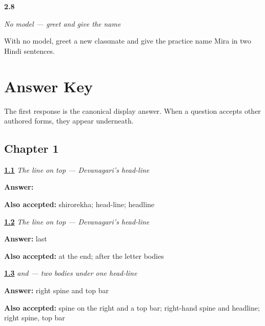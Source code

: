 \noindent\begin{minipage}[t]{\linewidth}
\raggedright
\hypertarget{review-HI-W06-two-sentence-no-model-check}{\textbf{2.8}} \emph{No model — greet and give the name}\par
\small With no model, greet a new classmate and give the practice name Mira in two Hindi sentences.
\end{minipage}\par\medskip

\chapter*{Answer Key}

The first response is the canonical display answer. When a question accepts other authored forms, they appear underneath.

\section*{Chapter 1}

\noindent\begin{minipage}[t]{\linewidth}
\raggedright
\hyperlink{review-HI-W01-shirorekha-na-ma-observe-trace}{\textbf{1.1}} \emph{The line on top — Devanagari's head-line}\par
\small \textbf{Answer:} \par
\footnotesize \textbf{Also accepted:} shirorekha; head-line; headline
\end{minipage}\par\medskip

\noindent\begin{minipage}[t]{\linewidth}
\raggedright
\hyperlink{review-HI-W01-shirorekha-na-ma-drawing-order}{\textbf{1.2}} \emph{The line on top — Devanagari's head-line}\par
\small \textbf{Answer:} last\par
\footnotesize \textbf{Also accepted:} at the end; after the letter bodies
\end{minipage}\par\medskip

\noindent\begin{minipage}[t]{\linewidth}
\raggedright
\hyperlink{review-HI-W01-na-ma-guided-copy}{\textbf{1.3}} \emph{ and  — two bodies under one head-line}\par
\small \textbf{Answer:} right spine and top bar\par
\footnotesize \textbf{Also accepted:} spine on the right and a top bar; right-hand spine and headline; right spine, top bar
\end{minipage}\par\medskip

